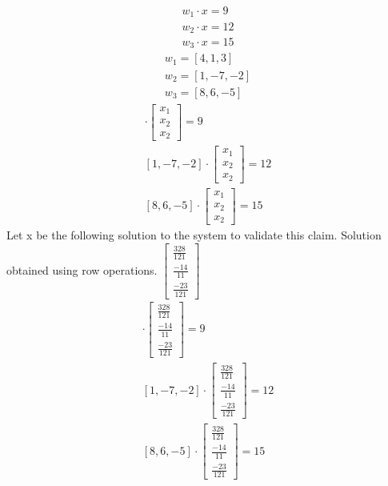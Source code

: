 \documentclass[12pt,a4paper]{article}
\begin{document}
\begin{enumerate}[label=(\alph*)]
     \begin{align*}
       w_1\cdot x=  9\\
       w_2 \cdot x=  12\\
       w_3\cdot x=  15
     \end{align*}
     \begin{align*}
       w_1 = [4 , 1 , 3]\\
       w_2 = [1 , -7 , -2]\\
       w_3 = [8 , 6 , -5]
     \end{align*}
     \begin{align*}
      [4 , 1 , 3] \cdot
      \begin{bmatrix}
       x_1 \\
       x_2 \\
       x_2
     \end{bmatrix}=9 \\
      [1 , -7 , -2] \cdot
      \begin{bmatrix}
       x_1 \\
       x_2 \\
       x_2
     \end{bmatrix}=12\\
      [8 , 6 , -5]\cdot
      \begin{bmatrix}
       x_1 \\
       x_2 \\
       x_2
     \end{bmatrix}=15
     \end{align*}
    Let x be the following solution to the system to validate this claim. Solution obtained using row operations.
    \renewcommand\arraystretch{2}
    $\begin{bmatrix}
     \frac{328}{121}\\
     \frac{-14}{11}\\
     \frac{-23}{121}
    \end{bmatrix}$
    \begin{align*}
     [4 , 1 , 3] \cdot
     \begin{bmatrix}
      \frac{328}{121}\\
      \frac{-14}{11}\\
      \frac{-23}{121}
     \end{bmatrix}=9 \\
     [1 , -7 , -2] \cdot
     \begin{bmatrix}
      \frac{328}{121}\\
      \frac{-14}{11}\\
      \frac{-23}{121}
     \end{bmatrix}=12\\
     [8 , 6 , -5]\cdot
     \begin{bmatrix}
      \frac{328}{121}\\
      \frac{-14}{11}\\
      \frac{-23}{121}
     \end{bmatrix}=15
    \end{align*}
\end{enumerate}
\end{document}
